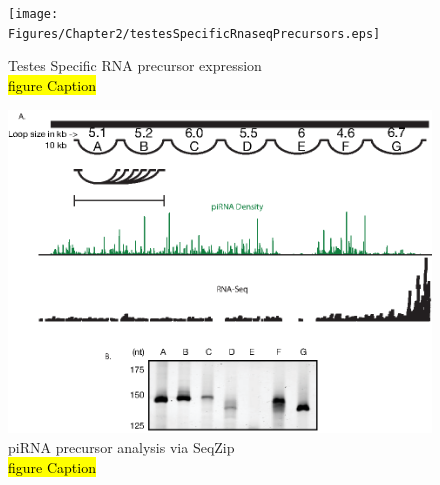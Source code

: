 \begin{figure}[htbp]
	\centering 
	\texttt{[image: Figures/Chapter2/testesSpecificRnaseqPrecursors.eps]}
	\caption[Testes Specific RNA precursor expression]
	{
		Testes Specific RNA precursor expression\\
		\hl{figure Caption}
	}
	\label{fig:Hiv tx via SeqZip}
\end{figure}


\begin{figure}[htbp]
	\centering 
	\includegraphics{Figures/Chapter2/piRNAPrecurserAnalyisBySeqZip.eps}
	\caption[piRNA precursor analysis via SeqZip]
	{
		piRNA precursor analysis via SeqZip\\
		\hl{figure Caption}
	}
	\label{fig:Hiv tx via SeqZip}
\end{figure}



